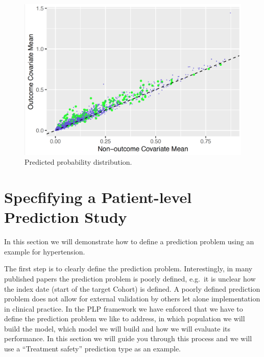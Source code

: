 \documentclass[11pt]{book}
\theoremstyle{definition}
\theoremstyle{definition}
\theoremstyle{definition}
\theoremstyle{remark}
\begin{document}
\begin{figure}

{\centering \includegraphics[width=1\linewidth]{images/PatientLevelPrediction/variableScatterplot} 

}

\caption{Predicted probability distribution.}\label{fig:plpVarScatter}
\end{figure}

\newpage

\hypertarget{specfifying-a-patient-level-prediction-study}{%
\section{Specfifying a Patient-level Prediction Study}\label{specfifying-a-patient-level-prediction-study}}

In this section we will demonstrate how to define a prediction problem using an example for hypertension.

The first step is to clearly define the prediction problem. Interestingly, in many published papers the prediction problem is poorly defined, e.g.~it is unclear how the index date (start of the target Cohort) is defined. A poorly defined prediction problem does not allow for external validation by others let alone implementation in clinical practice. In the PLP framework we have enforced that we have to define the prediction problem we like to address, in which population we will build the model, which model we will build and how we will evaluate its performance. In this section we will guide you through this process and we will use a ``Treatment safety'' prediction type as an example.
\end{document}

